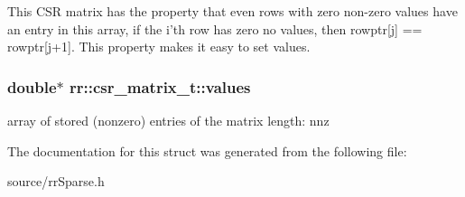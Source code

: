 This C\-S\-R matrix has the property that even rows with zero non-\/zero values have an entry in this array, if the i'th row has zero no values, then rowptr\mbox{[}j\mbox{]} == rowptr\mbox{[}j+1\mbox{]}. This property makes it easy to set values. \hypertarget{structrr_1_1csr__matrix__t_a0d2c69751a73afdfa97a44f3093a070c}{
\subsubsection[{values}]{\setlength{\rightskip}{0pt plus 5cm}double$\ast$ rr\-::csr\-\_\-matrix\-\_\-t\-::values}}\label{structrr_1_1csr__matrix__t_a0d2c69751a73afdfa97a44f3093a070c}
array of stored (nonzero) entries of the matrix length\-: nnz 

The documentation for this struct was generated from the following file\-:\begin{DoxyCompactItemize}
\item 
source/rr\-Sparse.\-h\end{DoxyCompactItemize}

